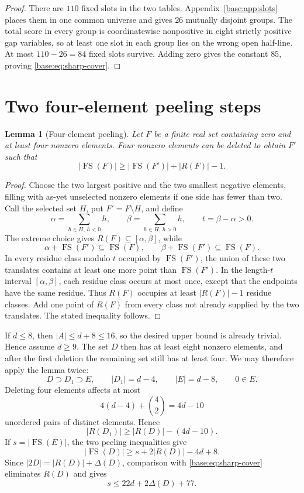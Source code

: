 \documentclass[11pt,a4paper]{article}
\newtheorem{lemma}[theorem]{Lemma}
\theoremstyle{remark}
\newcommand{\FS}{\operatorname{FS}}
\newcommand{\card}[1]{\lvert #1\rvert}
\begin{document}
\begin{proof}
There are $110$ fixed slots in the two tables.  Appendix~\ref{base:app:slots}
places them in one common universe and gives $26$ mutually disjoint groups.
The total score in every group is coordinatewise nonpositive in eight
strictly positive gap variables, so at least one slot in each group lies on
the wrong open half-line.  At most $110-26=84$ fixed slots survive.  Adding
zero gives the constant $85$, proving \eqref{base:eq:sharp-cover}.
\end{proof}

\section{Two four-element peeling steps}\label{base:sec:peeling}

\begin{lemma}[Four-element peeling]\label{base:lem:peeling}
Let $F$ be a finite real set containing zero and at least four nonzero
elements.  Four nonzero elements can be deleted to obtain $F'$ such that
\[
 \card{\FS(F)}\geq\card{\FS(F')}+\card{R(F)}-1.
\]
\end{lemma}

\begin{proof}
Choose the two largest positive and the two smallest negative elements,
filling with as-yet unselected nonzero elements if one side has fewer than
two.  Call the selected set $H$, put $F'=F\setminus H$, and define
\[
 \alpha=\sum_{h\in H,\,h<0}h,
 \qquad \beta=\sum_{h\in H,\,h>0}h,
 \qquad t=\beta-\alpha>0.
\]
The extreme choice gives $R(F)\subseteq[\alpha,\beta]$, while
\[
 \alpha+\FS(F')\subseteq\FS(F),
 \qquad \beta+\FS(F')\subseteq\FS(F).
\]
In every residue class modulo $t$ occupied by $\FS(F')$, the union of these
two translates contains at least one more point than $\FS(F')$.  In the
length-$t$ interval $[\alpha,\beta]$, each residue class occurs at most once,
except that the endpoints have the same residue.  Thus $R(F)$ occupies at
least $\card{R(F)}-1$ residue classes.  Add one point of $R(F)$ from every
class not already supplied by the two translates.  The stated inequality
follows.
\end{proof}

If $d\leq8$, then $\card A\leq d+8\leq16$, so the desired upper bound is
already trivial.  Hence assume $d\geq9$.  The set $D$ then has at least eight
nonzero elements, and after the first deletion the remaining set still has at
least four.  We may therefore apply the lemma twice:
\[
 D\supset D_1\supset E,
 \qquad \card{D_1}=d-4,
 \qquad \card E=d-8,
 \qquad 0\in E.
\]
Deleting four elements affects at most
\[
 4(d-4)+\binom42=4d-10
\]
unordered pairs of distinct elements.  Hence
\[
 \card{R(D_1)}\geq\card{R(D)}-(4d-10).
\]
If $s=\card{\FS(E)}$, the two peeling inequalities give
\begin{equation}
 \card{\FS(D)}\geq s+2\card{R(D)}-4d+8.
 \label{base:eq:peel-lower}
\end{equation}
Since $\card{2D}=\card{R(D)}+\Delta(D)$, comparison with
\eqref{base:eq:sharp-cover} eliminates $R(D)$ and gives
\begin{equation}
 \boxed{s\leq22d+2\Delta(D)+77.}
 \label{base:eq:core-upper}
\end{equation}
\end{document}
